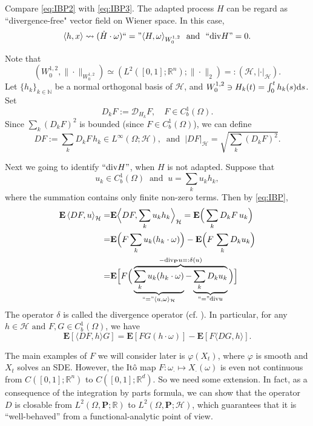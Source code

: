 \documentclass[twoside, 12pt]{book}
\numberwithin{equation}{chapter}
\def\cD{{\mathcal D}}
\def\cH{{\mathcal H}}
\def\mN{{\mathbb N}}
\def\mR{{\mathbb R}}
\def\bE{{\mathbf E}}
\def\bP{{\mathbf P}}
\def\l{\left}
\def\r{\right}
\def\<{\langle}
\def\>{\rangle}
\def\d{\text{\rm{d}}}
\def\div{\mathord{{\rm div}}}
\begin{document}
    Compare \eqref{eq:IBP2} with \eqref{eq:IBP3}. 
    The adapted process $H$ can be regard as ``divergence-free" vector field on Wiener space. In this case, 
    \[
    \<h,x\> \rightsquigarrow  (\dot H \cdot \omega)``="\< H,  \omega\>_{W^{1,2}_0}~ \mbox{ and }~ ``\div H"=0.
    \]  
    
    \medspace
    
    Note that 
    \[
    (W^{1,2}_0, \|\cdot\|_{W^{1,2}_0})\simeq (L^2([0,1];\mR^n); \|\cdot\|_2)=:( \cH, |\cdot|_{ \cH}). 
    \]
    Let $\{h_k\}_{k\in \mN}$ be a normal orthogonal basis of $\cH$, and $W^{1,2}_0 \ni H_k(t)=\int_0^t h_k(s) \d s$.  Set 
    \[
        D_kF:=\cD_{H_k}F, \quad F\in C_b^1(\Omega). 
    \]
    Since $\sum_k ({D_k}F)^2$ is bounded (since $F\in C_b^1(\Omega)$), we can define 
    \[
        D F:= \sum_k D_k F \, h_k\in L^\infty(\Omega; \cH), ~\mbox{ and }~ |DF|_{\cH}= \sqrt{\sum_k ({D_k}F)^2}. 
    \]
    
     Next we going to identify $``\div H"$, when $H$ is not adapted. Suppose that 
     \[
          u_k\in C^1_b(\Omega)~\mbox{ and }~ u= \sum_{k} u_k h_k,
     \] 
     where the summation contains only finite non-zero terms. Then by \eqref{eq:IBP}, 
    \[
    \begin{aligned}
    	\bE \l\<DF, u\r\>_{\cH} =&\bE \Big\<DF, \sum_{k} u_k h_k\Big\>_{\cH} = \bE \Big(\sum_{k} D_k F\, u_k \Big)\\
    	=& \bE \Big(F \sum_{k} u_k  (h_k \cdot \omega) \Big) - \bE \Big(F\, \sum_{k} D_{k} u_k\Big)\\
    	=& \bE \Big[ F \Big( \overbrace{  \underbrace{\sum_{k} u_k  (h_k\cdot\omega) }_{``="\<u,\omega\>_{\cH}}-  \underbrace{\sum_{k} D_{k} u_k}_{``="\div u}  }^{-\div_{\bP} u=:\delta(u)} \Big)\Big]
    \end{aligned}
    \]
    The operator $\delta$ is called the divergence operator (cf. \cite{nualart2006malliavin}). In particular, for any $h\in \cH \mbox{ and } F,G\in C^1_b(\Omega)$, we have 
    \begin{equation}
    	\bE [\<DF, h\>G]=\bE [ FG(h\cdot \omega)]-\bE[F\<DG,h\>]. 
    \end{equation}
    
    \medspace 
    
    The main examples of $F$ we will consider later is $\varphi(X_t)$, where $\varphi$ is smooth and $X_t$ solves an SDE. However, the It\^o map $F: \omega_{\cdot}\mapsto X_{\cdot}(\omega)$ is even not continuous from $C([0,1];\mR^n)$ to $C([0,1];\mR^d)$. So we need some extension. In fact, as a consequence of the integration by parts formula, we can show that the operator $D$ is closable  from $L^2(\Omega,\bP;\mR)$ to $L^2(\Omega,\bP;\cH)$, which guarantees that it is “well-behaved” from a functional-analytic point of view.
    
\end{document}
